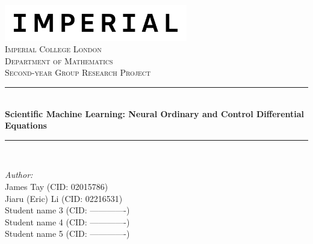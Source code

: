 \documentclass[a4paper,11pt, titlepage]{article}
\theoremstyle{definition}
\theoremstyle{plain}
\theoremstyle{remark}
\newcommand{\reporttitle}{Scientific Machine Learning: Neural Ordinary and Control Differential Equations} %
\newcommand{\reportauthorA}{James Tay (CID: 02015786)} %
\newcommand{\reportauthorB}{Jiaru (Eric) Li (CID: 02216531)} %
\newcommand{\reportauthorC}{Student name 3 (CID: -------------)} %
\newcommand{\reportauthorD}{Student name 4 (CID: -------------)} %
\newcommand{\reportauthorE}{Student name 5 (CID: -------------)} %
\begin{document}
\begin{titlepage}
\newcommand{\HRule}{\rule{\linewidth}{0.5mm}} %
\includegraphics[width=8cm]{Imperial_logo.png}\\[1cm] %
\center %
\textsc{\LARGE Imperial College London}\\[0.5cm] 
\textsc{\Large Department of Mathematics}\\[1.5cm] 
\textsc{\Large Second-year Group Research Project}\\[0.5cm]
\makeatletter
\HRule \\[0.6cm]
{\huge \bfseries \reporttitle}\\[0.6cm] %
\HRule \\[1.5cm]
\begin{minipage}{0.4\textwidth}
\begin{flushleft} \large
\emph{Author:}\\
\reportauthorA \\
\reportauthorB \\
\reportauthorC \\
\reportauthorD \\
\reportauthorE
\end{flushleft}

\end{minipage}
\end{titlepage}
\end{document}
